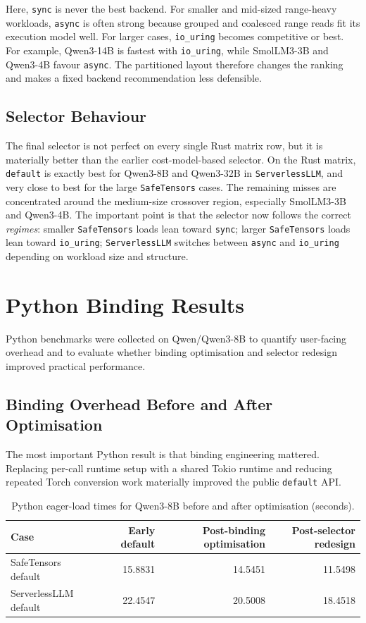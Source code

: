 Here, \texttt{sync} is never the best backend. For smaller and mid-sized range-heavy workloads, \texttt{async} is often strong because grouped and coalesced range reads fit its execution model well. For larger cases, \texttt{io\_uring} becomes competitive or best. For example, Qwen3-14B is fastest with \texttt{io\_uring}, while SmolLM3-3B and Qwen3-4B favour \texttt{async}. The partitioned layout therefore changes the ranking and makes a fixed backend recommendation less defensible.

\subsection{Selector Behaviour}

The final selector is not perfect on every single Rust matrix row, but it is materially better than the earlier cost-model-based selector. On the Rust matrix, \texttt{default} is exactly best for Qwen3-8B and Qwen3-32B in \texttt{ServerlessLLM}, and very close to best for the large \texttt{SafeTensors} cases. The remaining misses are concentrated around the medium-size crossover region, especially SmolLM3-3B and Qwen3-4B. The important point is that the selector now follows the correct \emph{regimes}: smaller \texttt{SafeTensors} loads lean toward \texttt{sync}; larger \texttt{SafeTensors} loads lean toward \texttt{io\_uring}; \texttt{ServerlessLLM} switches between \texttt{async} and \texttt{io\_uring} depending on workload size and structure.

\section{Python Binding Results}

Python benchmarks were collected on Qwen/Qwen3-8B to quantify user-facing overhead and to evaluate whether binding optimisation and selector redesign improved practical performance.

\subsection{Binding Overhead Before and After Optimisation}

The most important Python result is that binding engineering mattered. Replacing per-call runtime setup with a shared Tokio runtime and reducing repeated Torch conversion work materially improved the public \texttt{default} API.

\begin{table}[h]
\caption{Python eager-load times for Qwen3-8B before and after optimisation (seconds).}
\label{tab:python-optimisation}
\centering
\begin{tabular}{lrrr}
\toprule
Case & Early default & Post-binding optimisation & Post-selector redesign \\
\midrule
SafeTensors default & 15.8831 & 14.5451 & 11.5498 \\
ServerlessLLM default & 22.4547 & 20.5008 & 18.4518 \\
\bottomrule
\end{tabular}
\end{table}

